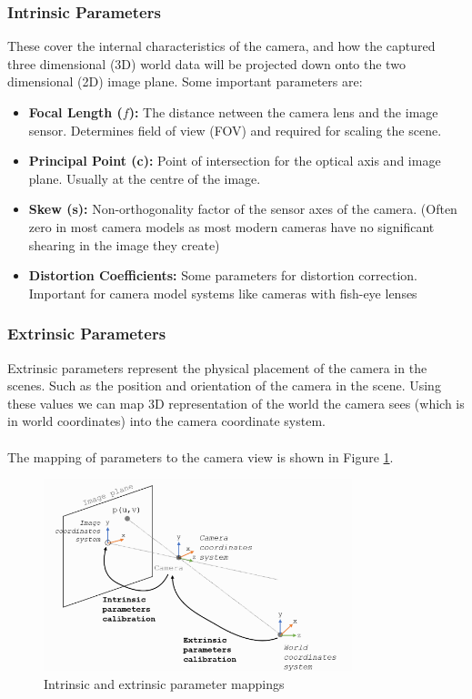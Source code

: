 \subsubsection{Intrinsic Parameters}\label{sec:intrinsic}

These cover the internal characteristics of the camera, and how the captured three dimensional (3D) world data will be projected down onto the two dimensional (2D) image plane.
Some important parameters are:

\begin{itemize}
  \item \textbf{Focal Length ($f$):} The distance netween the camera lens and the image sensor. Determines field of view (FOV) and required for scaling the scene.
  \item \textbf{Principal Point (c):} Point of intersection for the optical axis and image plane. Usually at the centre of the image.
  \item \textbf{Skew (s):} Non-orthogonality factor of the sensor axes of the camera. (Often zero in most camera models as most modern cameras have no significant shearing in the image they create)
  \item \textbf{Distortion Coefficients:} Some parameters for distortion correction. Important for camera model systems like cameras with fish-eye lenses \cite{king1989history}
\end{itemize}

\subsubsection{Extrinsic Parameters}
Extrinsic parameters represent the physical placement of the camera in the scenes. Such as the position and orientation of the camera in the scene. Using these values we can map  3D representation of the world the camera sees (which is in world coordinates) into the camera coordinate system.
\\\\
The mapping of parameters to the camera view is shown in Figure \ref{fig:in-extrinsic}.

\begin{figure}[h]
  \centering
  \includegraphics[width=0.8\textwidth]{assets/background/in-extrinsic.png}
  \caption{Intrinsic and extrinsic parameter mappings \cite{mphy0026camera}}\label{fig:in-extrinsic}
\end{figure}

